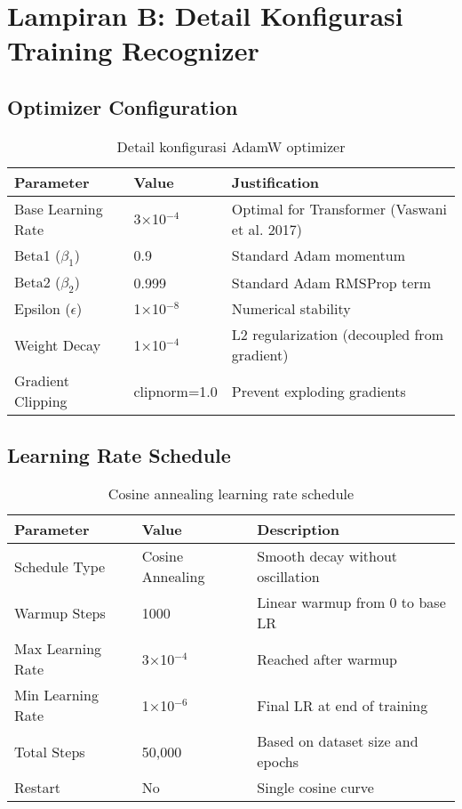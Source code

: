 \documentclass[12pt,a4paper]{article}
\begin{document}

\section{Lampiran B: Detail Konfigurasi Training Recognizer}
\label{appendix:training-config}

\subsection{Optimizer Configuration}

\begin{table}[H]
\centering
\caption{Detail konfigurasi AdamW optimizer}
\label{tab:appendix-optimizer}
\small
\begin{tabular}{|l|l|p{7cm}|}
\hline
\textbf{Parameter} & \textbf{Value} & \textbf{Justification} \\ \hline
Base Learning Rate & 3×10$^{-4}$ & Optimal for Transformer (Vaswani et al. 2017) \\ \hline
Beta1 ($\beta_1$) & 0.9 & Standard Adam momentum \\ \hline
Beta2 ($\beta_2$) & 0.999 & Standard Adam RMSProp term \\ \hline
Epsilon ($\epsilon$) & 1×10$^{-8}$ & Numerical stability \\ \hline
Weight Decay & 1×10$^{-4}$ & L2 regularization (decoupled from gradient) \\ \hline
Gradient Clipping & clipnorm=1.0 & Prevent exploding gradients \\ \hline
\end{tabular}
\end{table}

\subsection{Learning Rate Schedule}

\begin{table}[H]
\centering
\caption{Cosine annealing learning rate schedule}
\label{tab:appendix-lr-schedule}
\small
\begin{tabular}{|l|l|p{7cm}|}
\hline
\textbf{Parameter} & \textbf{Value} & \textbf{Description} \\ \hline
Schedule Type & Cosine Annealing & Smooth decay without oscillation \\ \hline
Warmup Steps & 1000 & Linear warmup from 0 to base LR \\ \hline
Max Learning Rate & 3×10$^{-4}$ & Reached after warmup \\ \hline
Min Learning Rate & 1×10$^{-6}$ & Final LR at end of training \\ \hline
Total Steps & 50,000 & Based on dataset size and epochs \\ \hline
Restart & No & Single cosine curve \\ \hline
\end{tabular}
\end{table}
\end{document}
